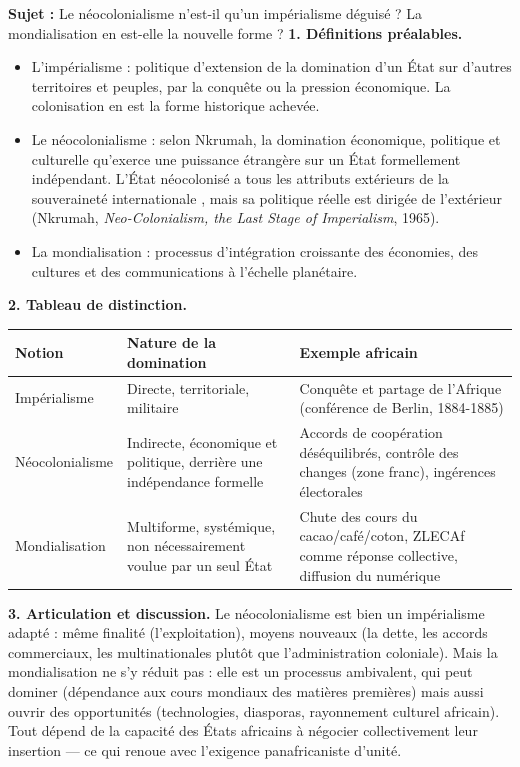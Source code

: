 \documentclass[11pt]{article}
\newcommand{\cle}[1]{{\popxbold\color{popdark}#1}}
\begin{document}
\begin{exoresolu}
\textbf{Sujet :} Le néocolonialisme n'est-il qu'un impérialisme déguisé ? La mondialisation en est-elle la nouvelle forme ?
\tcblower
\textbf{1. Définitions préalables.}
\begin{itemize}
\item L'\cle{impérialisme} : politique d'extension de la domination d'un État sur d'autres territoires et peuples, par la conquête ou la pression économique. La colonisation en est la forme historique achevée.
\item Le \cle{néocolonialisme} : selon Nkrumah, la domination économique, politique et culturelle qu'exerce une puissance étrangère sur un État formellement indépendant. L'État néocolonisé \guillemotleft a tous les attributs extérieurs de la souveraineté internationale \guillemotright, mais sa politique réelle est dirigée de l'extérieur (Nkrumah, \emph{Neo-Colonialism, the Last Stage of Imperialism}, 1965).
\item La \cle{mondialisation} : processus d'intégration croissante des économies, des cultures et des communications à l'échelle planétaire.
\end{itemize}

\textbf{2. Tableau de distinction.}
\begin{center}
\begin{tabularx}{\linewidth}{|l|X|X|}
\hline
\rowcolor{popblueL} \textbf{Notion} & \textbf{Nature de la domination} & \textbf{Exemple africain} \\
\hline
Impérialisme & Directe, territoriale, militaire & Conquête et partage de l'Afrique (conférence de Berlin, 1884-1885) \\
\hline
Néocolonialisme & Indirecte, économique et politique, derrière une indépendance formelle & Accords de coopération déséquilibrés, contrôle des changes (zone franc), ingérences électorales \\
\hline
Mondialisation & Multiforme, systémique, non nécessairement voulue par un seul État & Chute des cours du cacao/café/coton, ZLECAf comme réponse collective, diffusion du numérique \\
\hline
\end{tabularx}
\end{center}

\textbf{3. Articulation et discussion.} Le néocolonialisme est bien un impérialisme adapté : même finalité (l'exploitation), moyens nouveaux (la dette, les accords commerciaux, les multinationales plutôt que l'administration coloniale). Mais la mondialisation ne s'y réduit pas : elle est un processus ambivalent, qui peut dominer (dépendance aux cours mondiaux des matières premières) mais aussi ouvrir des opportunités (technologies, diasporas, rayonnement culturel africain). Tout dépend de la capacité des États africains à négocier collectivement leur insertion — ce qui renoue avec l'exigence panafricaniste d'unité.


\end{exoresolu}
\end{document}
